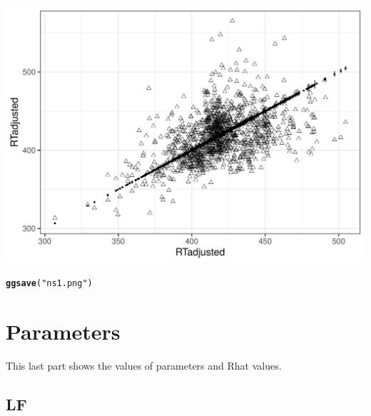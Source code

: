 \documentclass{article}\usepackage[]{graphicx}\usepackage[]{color}
\makeatletter
\def\maxwidth{ %
  \ifdim\Gin@nat@width>\linewidth
    \linewidth
  \else
    \Gin@nat@width
  \fi
}
\newcommand{\hlstr}[1]{\textcolor[rgb]{0.192,0.494,0.8}{#1}}%
\newcommand{\hlstd}[1]{\textcolor[rgb]{0.345,0.345,0.345}{#1}}%
\newcommand{\hlkwd}[1]{\textcolor[rgb]{0.737,0.353,0.396}{\textbf{#1}}}%
\newenvironment{kframe}{%
 \def\at@end@of@kframe{}%
 \ifinner\ifhmode%
  \def\at@end@of@kframe{\end{minipage}}%
  \begin{minipage}{\columnwidth}%
 \fi\fi%
 \def\FrameCommand##1{\hskip\@totalleftmargin \hskip-\fboxsep
 \colorbox{shadecolor}{##1}\hskip-\fboxsep
     \hskip-\linewidth \hskip-\@totalleftmargin \hskip\columnwidth}%
 \MakeFramed {\advance\hsize-\width
   \@totalleftmargin\z@ \linewidth\hsize
   \@setminipage}}%
 {\par\unskip\endMakeFramed%
 \at@end@of@kframe}
\newenvironment{knitrout}{}{} %
\makeatother
\begin{document}
\begin{knitrout}
\color{fgcolor}
\includegraphics[width=\maxwidth]{figures/figure_ns_unnamed-chunk-27-1} 

\end{knitrout}

\begin{knitrout}
\color{fgcolor}\begin{kframe}
\begin{alltt}
\hlkwd{ggsave}\hlstd{(}\hlstr{"ns1.png"}\hlstd{)}
\end{alltt}


{\ttfamily\noindent\itshape\color{messagecolor}{\#\# Saving 7 x 7 in image}}\end{kframe}
\end{knitrout}


\section{Parameters}

This last part shows the values of parameters and Rhat values.



\subsection{LF}
\end{document}

